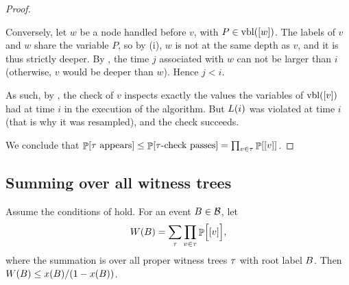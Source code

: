 \begin{proof}
\begin{compactitem}
        \smallskip%
        \item Conversely, let $w$ be a node handled before $v$, with
        $P \in \vblX{\LabelX{w}}$. The labels of $v$ and $w$ share
        the variable $P$, so by  (i), $w$ is not at
        the same depth as $v$, and it is thus strictly deeper. By
        , the time $j$ associated with $w$ can not be
        larger than $i$ (otherwise, $v$ would be deeper than $w$).
        Hence $j < i$.
    \end{compactitem}
    \smallskip%
    As such, by , the check of $v$ inspects
    exactly the values the variables of $\vblX{\LabelX{v}}$ had at time
    $i$ in the execution of the algorithm. But $\ELogX{i}$ was
    violated at time $i$ (that is why it was resampled), and the check
    succeeds.

    \smallskip

    We conclude that
    $\Prob{\WTree \text{ appears}} \leq \Prob{\WTree\text{-check
          passes}} = \prod_{v \in \WTree} \Prob{\LabelX{v}}$.
\end{proof}

\subsection{Summing over all witness trees}

\begin{lemma}
    Assume the conditions of  hold. For an event
    ${B} \in \mathcal{B}$, let
    \begin{equation*}
        \WSum(\BEvent)%
        =%
        \sum_{\WTree} \prod_{v \in \WTree} \Prob{\Bigl.\LabelX{v}},
    \end{equation*}
    where the summation is over all proper witness trees $\tau$ with
    root label ${B}$. Then
    $\WSum(\BEvent) \leq x(\BEvent)/\pth{1 - x(\BEvent)}$.
\end{lemma}


